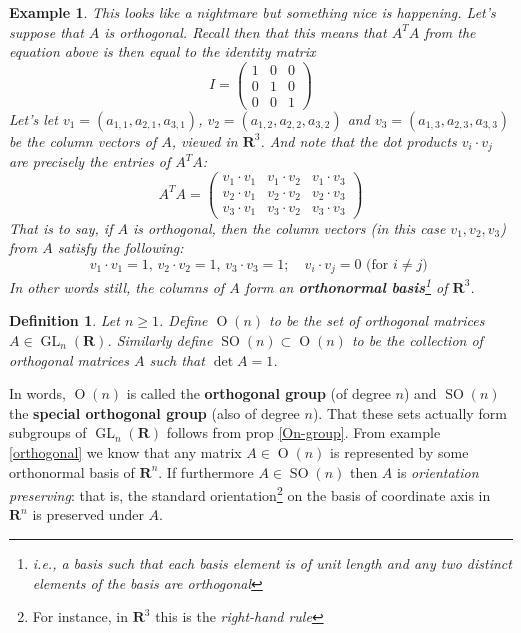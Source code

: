 \documentclass[12pt]{article}
\numberwithin{equation}{subsection}
\newtheorem{defn}[subsection]{Definition}
\theoremstyle{note}
\newtheorem{example}[subsection]{Example}
\newcommand{\GL}{\operatorname{GL}}
\newcommand{\Or}{\operatorname{O}}
\newcommand{\SO}{\operatorname{SO}}
\begin{document}
\begin{example}
This looks like a nightmare but something nice is happening. Let's suppose that $A$ is orthogonal. Recall then that this means that $A^TA$ from the equation above is then equal to the identity matrix \[I=\begin{pmatrix} 1 & 0 & 0\\ 0 & 1 & 0 \\ 0 & 0 & 1\end{pmatrix}\]
Let's let $v_1=(a_{1,1}, a_{2,1}, a_{3,1})$, $v_2=(a_{1,2}, a_{2,2}, a_{3,2})$ and $v_3=(a_{1,3}, a_{2,3}, a_{3,3})$ be the \textit{column} vectors of $A$, viewed in $\mathbf{R}^3$. And note that the dot products $v_i\cdot v_j$ are precisely the entries of $A^TA$: \[ A^TA=\begin{pmatrix} v_1\cdot v_1 & v_1\cdot v_2 & v_1\cdot v_3 \\ v_2\cdot v_1 & v_2\cdot v_2 & v_2 \cdot v_3 \\ v_3 \cdot v_1 & v_3\cdot v_2  & v_3\cdot v_3\end{pmatrix}\]  That is to say, if $A$ is orthogonal, then the column vectors (in this case $v_1,v_2,v_3$) from $A$ satisfy the following: \[ v_1\cdot v_1=1,\, v_2\cdot v_2=1, \,v_3\cdot v_3=1; \quad v_i\cdot v_j=0 \text{ (for $i\neq j$) }\]
In other words still, the columns of $A$ form an \textbf{orthonormal basis}\footnote{i.e., a basis such that each basis element is of unit length and any two distinct elements of the basis are orthogonal} of $\mathbf{R}^3$.
\end{example}

\begin{defn} 
Let $n\geq 1$. Define $\Or(n)$ to be the set of orthogonal matrices $A\in \GL_n(\mathbf{R})$. Similarly define $\SO(n)\subset \Or(n)$ to be the collection of orthogonal matrices $A$ such that $\det A=1$. 
\end{defn}

In words, $\Or(n)$ is called the \textbf{orthogonal group} (of degree $n$) and $\SO(n)$ the \textbf{special orthogonal group} (also of degree $n$). That these sets actually form subgroups of $\GL_n(\mathbf{R})$ follows from prop \ref{On-group}. From example \ref{orthogonal} we know that any matrix $A\in \Or(n)$ is represented by some orthonormal basis of $\mathbf{R}^n$. If furthermore $A\in \SO(n)$ then $A$ is \textit{orientation preserving}: that is, the standard orientation\footnote{For instance, in $\mathbf{R}^3$ this is the \textit{right-hand rule}} on the basis of coordinate axis in $\mathbf{R}^n$ is preserved under $A$.
\end{document}
